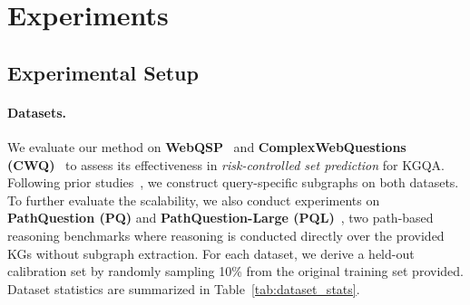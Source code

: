 \documentclass{article}
\theoremstyle{plain}
\newtheorem{theorem}{Theorem}[section]
\theoremstyle{definition}
\theoremstyle{remark}
\begin{document}


\section{Experiments}

\subsection{Experimental Setup}
\paragraph{Datasets.} We evaluate our method on \textbf{WebQSP}~\cite{WebQSP} and \textbf{ComplexWebQuestions (CWQ)}~\cite{CWQ} to assess its effectiveness in \emph{risk-controlled set prediction} for KGQA. %
Following prior studies~\citep{subgraph_extract,Ni_Wang_Cheng_Blasch_Derr_2025}, we construct query-specific subgraphs on both datasets. To further evaluate the scalability, we also conduct experiments on \textbf{PathQuestion (PQ)} and \textbf{PathQuestion-Large (PQL)}~\cite{PQ}, two path-based reasoning benchmarks where reasoning is conducted directly over the provided KGs without subgraph extraction. For each dataset, we derive a held-out calibration set by randomly sampling 10\% from the original training set provided. Dataset statistics are summarized in Table~\ref{tab:dataset_stats}.
\end{document}
